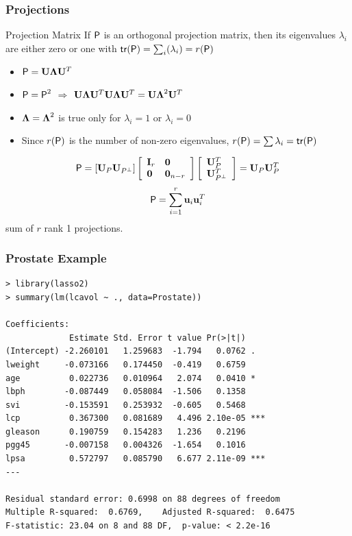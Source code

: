 \documentclass{beamer}
\begin{document}
\begin{frame}
  \frametitle{Projections}
\begin{block}{Projection Matrix}
If $\P$ is an orthogonal projection matrix, then its eigenvalues
$\lambda_i$ are
either zero or one with $\tr (\P) = \sum_i(\lambda_i) = r(\P)$
\end{block} \pause
\begin{itemize}
\item   $\P = \U \Lambdab \U^T $  \pause
\item $\P = \P^2$  $\Rightarrow$ $\U \Lambdab \U^T\U \Lambdab \U^T =
  \U\Lambdab^2\U^T$  \pause
\item $\Lambdab = \Lambdab^2$ is true only for $\lambda_i = 1$ or
  $\lambda_i =0$  \pause
\item Since $r(\P)$ is the number of non-zero eigenvalues, $r(\P) =
  \sum \lambda_i = \tr(\P)$  \pause
\end{itemize}
$$\P = \left[\U_P \U_{P^\perp} \right] 
\left[
  \begin{array}{ll}
    \I_r & \zero \\
    \zero & \zero_{n-r}
  \end{array}
\right] \left[
  \begin{array}{l}
    \U_P^T \\
\U^T_{P^\perp}
  \end{array}
\right] = \U_P \U^T_P$$
$$\P = \sum_{i=1}^r \u_i \u_i^T$$  
sum of $r$ rank 1 projections.
\end{frame}


\begin{frame}[fragile]
  \frametitle{Prostate Example}
  \begin{small}
\begin{verbatim}
> library(lasso2)
> summary(lm(lcavol ~ ., data=Prostate))

Coefficients:
             Estimate Std. Error t value Pr(>|t|)    
(Intercept) -2.260101   1.259683  -1.794   0.0762 .  
lweight     -0.073166   0.174450  -0.419   0.6759    
age          0.022736   0.010964   2.074   0.0410 *  
lbph        -0.087449   0.058084  -1.506   0.1358    
svi         -0.153591   0.253932  -0.605   0.5468    
lcp          0.367300   0.081689   4.496 2.10e-05 ***
gleason      0.190759   0.154283   1.236   0.2196    
pgg45       -0.007158   0.004326  -1.654   0.1016    
lpsa         0.572797   0.085790   6.677 2.11e-09 ***
---

Residual standard error: 0.6998 on 88 degrees of freedom
Multiple R-squared:  0.6769,	Adjusted R-squared:  0.6475 
F-statistic: 23.04 on 8 and 88 DF,  p-value: < 2.2e-16
\end{verbatim}
    
  \end{small}

\end{frame}
\end{document}
